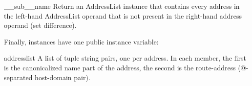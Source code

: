 \begin{methoddesc}{__sub__}{name}
Return an AddressList instance that contains every address in the
left-hand AddressList operand that is not present in the right-hand
address operand (set difference).
\end{methoddesc}


Finally,  instances have one public instance variable:

\begin{memberdesc}{addresslist}
A list of tuple string pairs, one per address.  In each member, the
first is the canonicalized name part of the address, the second is the
route-address (@-separated host-domain pair).
\end{memberdesc}
